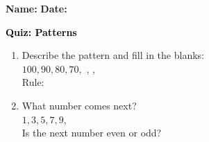 \documentclass[12pt, letterpaper, fleqn]{article}
\newcommand{\blank}{\underline{\hspace{2.2cm}}}
\newcommand{\blanklong}{\underline{\hspace{6.5cm}}}
\begin{document}
\textbf{Name:} \underline{\hspace{5cm}}
\hfill
\textbf{Date:} \underline{\hspace{3cm}}\\

\begin{tcolorbox}[colback=customteal!20]
    \large\textcolor{black}{\textbf{Quiz: Patterns}}
\end{tcolorbox}

\vspace{5mm}
\begin{enumerate}[itemsep=2.5cm, leftmargin=0.6cm]
\item Describe the pattern and fill in the blanks:
\\
$100, 90, 80, 70,$ \blank, \blank, \blank \\
Rule: \blanklong

\item What number comes next?
\\
$1, 3, 5, 7, 9,$ \blank \\
Is the next number even or odd? \blank
\end{enumerate}
\end{document}
